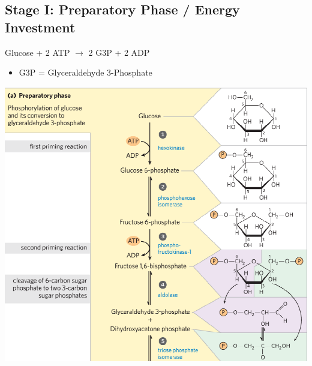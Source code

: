 \documentclass[10pt]{article}
\begin{document}
\subsection*{Stage I: Preparatory Phase / Energy Investment}
\begin{center}
    Glucose + 2 ATP $\rightarrow$ 2 G3P + 2 ADP
\end{center}
\begin{itemize}
	\item G3P = Glyceraldehyde 3-Phosphate
\end{itemize}
\begin{center} 
	\includegraphics*[width=\textwidth]{L3_2.png}
\end{center}

\pagebreak
\end{document}
